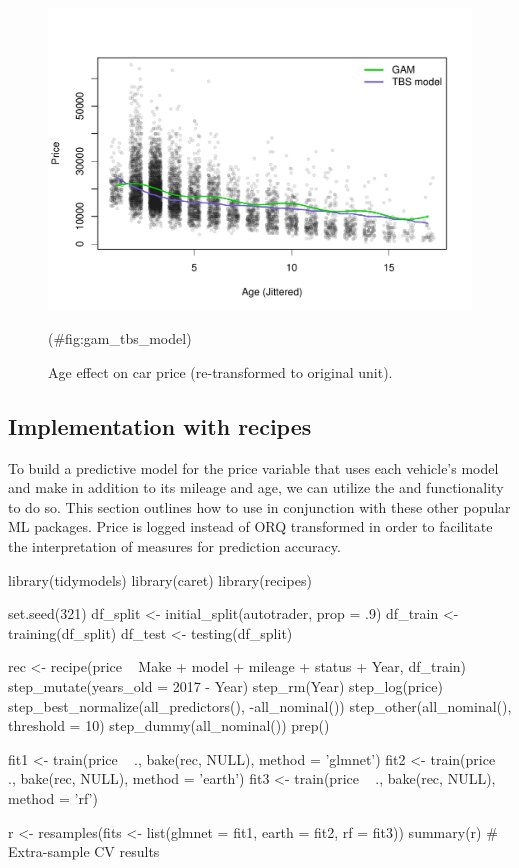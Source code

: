 \begin{Schunk}
\begin{figure}

{\centering \includegraphics[width=0.8\linewidth]{figs/gam_tbs_model-1} 

}

\caption[Age effect on car price (re-transformed to original unit)]{Age effect on car price (re-transformed to original unit).}(\#fig:gam_tbs_model)
\end{figure}
\end{Schunk}

\hypertarget{implementation-with-recipes}{%
\subsection{Implementation with
recipes}\label{implementation-with-recipes}}

To build a predictive model for the price variable that uses each
vehicle's model and make in addition to its mileage and age, we can
utilize the  and  functionality to do so. This
section outlines how to use  in conjunction with
these other popular ML packages. Price is logged instead of ORQ
transformed in order to facilitate the interpretation of measures for
prediction accuracy.

\begin{Schunk}
\begin{Sinput}
library(tidymodels)
library(caret)
library(recipes)

set.seed(321)
df_split <- initial_split(autotrader, prop = .9)
df_train <- training(df_split)
df_test <- testing(df_split)

rec <- recipe(price ~ Make + model +  mileage + status + Year, df_train) %
  step_mutate(years_old = 2017 - Year) %
  step_rm(Year) %
  step_log(price) %
  step_best_normalize(all_predictors(), -all_nominal()) %
  step_other(all_nominal(), threshold = 10) %
  step_dummy(all_nominal()) %
  prep()

fit1 <- train(price ~ ., bake(rec, NULL), method = 'glmnet')
fit2 <- train(price ~ ., bake(rec, NULL), method = 'earth')
fit3 <- train(price ~ ., bake(rec, NULL), method = 'rf')

r <- resamples(fits <- list(glmnet = fit1, earth = fit2, rf = fit3))
summary(r) # Extra-sample CV results
\end{Sinput}
\end{Schunk}

